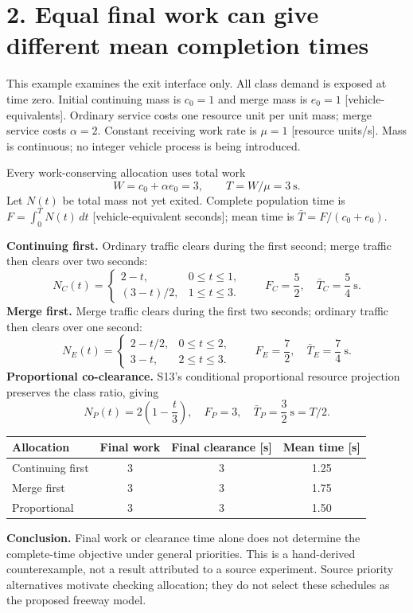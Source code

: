\documentclass[11pt,a4paper]{article}
\begin{document}
\newpage
\section*{2. Equal final work can give different mean completion times}
This example examines the exit interface only. All class demand is exposed at
time zero. Initial continuing mass is $c_0=1$ and merge mass is $e_0=1$
[vehicle-equivalents]. Ordinary service costs one resource unit per unit mass;
merge service costs $\alpha=2$. Constant receiving work rate is
$\mu=1$ [resource units/s]. Mass is continuous; no integer vehicle process is
being introduced.

Every work-conserving allocation uses total work
\[
 W=c_0+\alpha e_0=3,
 \qquad T=W/\mu=3\ \text{s}.
\]
Let $N(t)$ be total mass not yet exited. Complete population time is
$F=\int_0^T N(t)\,dt$ [vehicle-equivalent seconds]; mean time is
$\bar T=F/(c_0+e_0)$.

\textbf{Continuing first.} Ordinary traffic clears during the first second;
merge traffic then clears over two seconds:
\[
 N_{C}(t)=
 \begin{cases}2-t,&0\leq t\leq1,\\(3-t)/2,&1\leq t\leq3.\end{cases}
 \qquad F_C=\frac52,\quad \bar T_C=\frac54\ \text{s}.
\]
\textbf{Merge first.} Merge traffic clears during the first two seconds;
ordinary traffic then clears over one second:
\[
 N_{E}(t)=
 \begin{cases}2-t/2,&0\leq t\leq2,\\3-t,&2\leq t\leq3.\end{cases}
 \qquad F_E=\frac72,\quad \bar T_E=\frac74\ \text{s}.
\]
\textbf{Proportional co-clearance.} S13's conditional proportional resource
projection preserves the class ratio, giving
\[
 N_P(t)=2\left(1-\frac{t}{3}\right),\quad
 F_P=3,\quad \bar T_P=\frac32\ \text{s}=T/2.
\]
\begin{center}
\begin{tabular}{lccc}
\toprule
Allocation & Final work & Final clearance [s] & Mean time [s]\\
\midrule
Continuing first & 3 & 3 & 1.25\\
Merge first & 3 & 3 & 1.75\\
Proportional & 3 & 3 & 1.50\\
\bottomrule
\end{tabular}
\end{center}
\textbf{Conclusion.} Final work or clearance time alone does not determine the
complete-time objective under general priorities. This is a hand-derived
counterexample, not a result attributed to a source experiment. Source priority
alternatives motivate checking allocation; they do not select these schedules
as the proposed freeway model.
\end{document}
